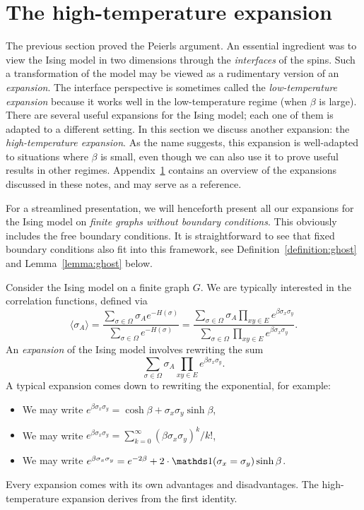 \section{The high-temperature expansion}

The previous section proved the Peierls argument.
An essential ingredient was to view the Ising model in two dimensions
through the \emph{interfaces} of the spins.
Such a transformation of the model may be viewed as a rudimentary version of
an \emph{expansion}.
The interface perspective is sometimes called the \emph{low-temperature expansion}
because it works well in the low-temperature regime (when $\beta$ is large).
There are several useful expansions for the Ising model;
each one of them is adapted to a different setting.
In this section we discuss another expansion: the \emph{high-temperature expansion}.
As the name suggests, this expansion is well-adapted to situations where $\beta$
is small, even though we can also use it to prove useful results in other regimes.
Appendix~\ref{} contains an overview of the expansions
discussed in these notes, and may serve as a reference.

For a streamlined presentation, we will henceforth present all our expansions
for the Ising model on \emph{finite graphs without boundary conditions}.
This obviously includes the free boundary conditions.
It is straightforward to see that fixed boundary conditions
also fit into this framework, see Definition~\ref{definition:ghost} and
Lemma~\ref{lemma:ghost} below.

Consider the Ising model on a finite graph $G$.
We are typically interested in the correlation functions,
defined via
\[
    \langle\sigma_A\rangle
    =
    \frac{\sum_{\sigma\in\Omega}\sigma_A e^{-H(\sigma)}}{\sum_{\sigma\in\Omega}e^{-H(\sigma)}}
    =
    \frac{\sum_{\sigma\in\Omega}\sigma_A \prod_{xy\in E} e^{\beta\sigma_x\sigma_y}
    }{\sum_{\sigma\in\Omega}\prod_{xy\in E} e^{\beta\sigma_x\sigma_y} }.
\]
An \emph{expansion} of the Ising model involves rewriting the sum
\[
    \sum_{\sigma\in\Omega}\sigma_A \prod_{xy\in E} e^{\beta\sigma_x\sigma_y}.
\]
A typical expansion comes down to rewriting the exponential, for example:
\begin{itemize}
    \item We may write $e^{\beta\sigma_x\sigma_y}=\cosh \beta + \sigma_x\sigma_y \sinh \beta$,
    \item We may write $e^{\beta\sigma_x\sigma_y}=\sum_{k=0}^\infty (\beta\sigma_x\sigma_y)^k/k!$,
    \item We may write $e^{\beta\sigma_x\sigma_y}=e^{-2\beta} +
        2\cdot\true{\sigma_x=\sigma_y}\sinh\beta$.
\end{itemize}
Every expansion comes with its own advantages and disadvantages.
The high-temperature expansion derives from the first identity.

